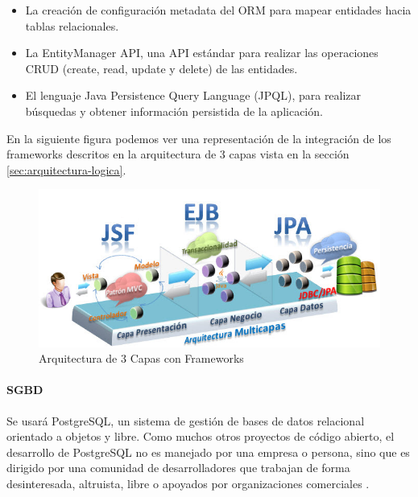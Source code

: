 \begin{itemize}
\begin{itemize}
\item La creación de configuración metadata del ORM para mapear entidades hacia tablas relacionales.
\item La EntityManager API, una API estándar para realizar las operaciones CRUD (create, read, update y delete) de las entidades.
\item El lenguaje Java Persistence Query Language (JPQL), para realizar búsquedas y obtener información persistida de la aplicación.
\end {itemize}

\end {itemize}

En la siguiente figura podemos ver una representación de la integración de los frameworks descritos en la arquitectura de 3 capas vista en la sección \ref{sec:arquitectura-logica}.

\vspace{10mm}

\begin{figure}[H]
\centering
  \includegraphics[scale=.60]{img/arquitectura-jee.jpg}
  \caption{Arquitectura de 3 Capas con Frameworks}
  \label{fig:arquitectura-jee}
\end{figure}

\vspace{10mm}

\paragraph*{SGBD}

Se usará PostgreSQL, un sistema de gestión de bases de datos relacional orientado a objetos y libre. Como muchos otros proyectos de código abierto, el desarrollo de PostgreSQL no es manejado por una empresa o persona, sino que es dirigido por una comunidad de desarrolladores que trabajan de forma desinteresada, altruista, libre o apoyados por organizaciones comerciales \cite{PostgreSQL}.\\ 

